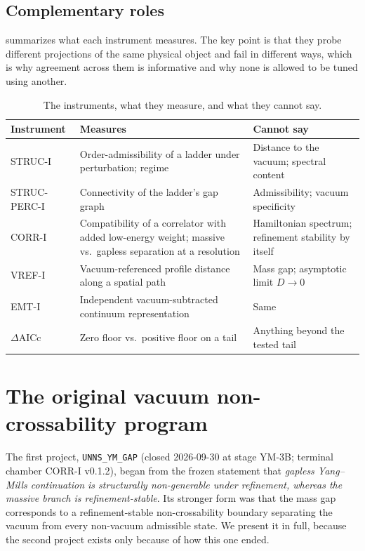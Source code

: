 \documentclass[11pt,a4paper]{article}
\theoremstyle{definition}
\theoremstyle{remark}
\begin{document}
\subsection{Complementary roles}
 summarizes what each instrument measures. The key point is that they probe different projections of the same physical object and fail in different ways, which is why agreement across them is informative and why none is allowed to be tuned using another.

\begin{table}[t]
\centering\small
\caption{The instruments, what they measure, and what they cannot say.}\label{tab:instruments}
\begin{tabularx}{\textwidth}{@{}l>{\raggedright\arraybackslash}X>{\raggedright\arraybackslash}X@{}}
\toprule Instrument & Measures & Cannot say\\\midrule
STRUC-I & Order-admissibility of a ladder under perturbation; regime & Distance to the vacuum; spectral content\\
STRUC-PERC-I & Connectivity of the ladder's gap graph & Admissibility; vacuum specificity\\
CORR-I & Compatibility of a correlator with added low-energy weight; massive vs.\ gapless separation at a resolution & Hamiltonian spectrum; refinement stability by itself\\
VREF-I & Vacuum-referenced profile distance along a spatial path & Mass gap; asymptotic limit $D\to0$\\
EMT-I & Independent vacuum-subtracted continuum representation & Same\\
$\Delta$AICc & Zero floor vs.\ positive floor on a tail & Anything beyond the tested tail\\\bottomrule
\end{tabularx}
\end{table}

\section{The original vacuum non-crossability program}\label{sec:original}

The first project, \texttt{UNNS\_YM\_GAP} (closed 2026-09-30 at stage YM-3B; terminal chamber CORR-I v0.1.2), began from the frozen statement that \emph{gapless Yang--Mills continuation is structurally non-generable under refinement, whereas the massive branch is refinement-stable}. Its stronger form was that the mass gap corresponds to a refinement-stable non-crossability boundary separating the vacuum from every non-vacuum admissible state. We present it in full, because the second project exists only because of how this one ended.
\end{document}
